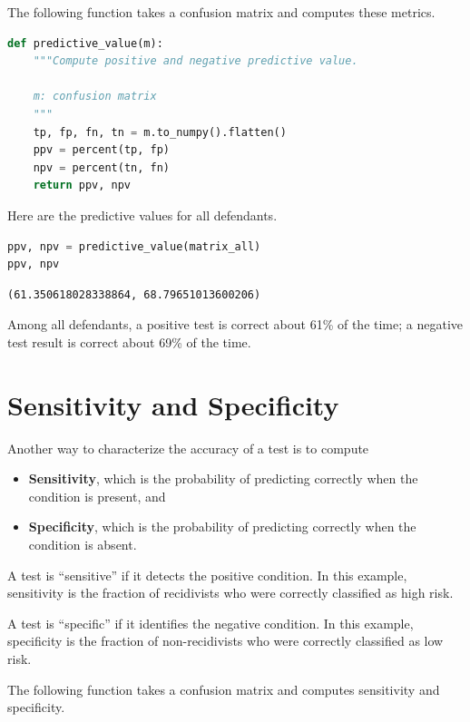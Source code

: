 The following function takes a confusion matrix and computes these
metrics.

\begin{lstlisting}[language=Python]
def predictive_value(m):
    """Compute positive and negative predictive value.
    
    m: confusion matrix
    """
    tp, fp, fn, tn = m.to_numpy().flatten()
    ppv = percent(tp, fp)
    npv = percent(tn, fn)
    return ppv, npv
\end{lstlisting}

Here are the predictive values for all defendants.

\begin{lstlisting}[language=Python]
ppv, npv = predictive_value(matrix_all)
ppv, npv
\end{lstlisting}

\begin{lstlisting}[]
(61.350618028338864, 68.79651013600206)
\end{lstlisting}

Among all defendants, a positive test is correct about 61\% of the time;
a negative test result is correct about 69\% of the time.

\hypertarget{sensitivity-and-specificity}{%
\section{Sensitivity and
Specificity}\label{sensitivity-and-specificity}}

Another way to characterize the accuracy of a test is to compute

\begin{itemize}
\item
  \textbf{Sensitivity}, which is the probability of predicting correctly
  when the condition is present, and
\item
  \textbf{Specificity}, which is the probability of predicting correctly
  when the condition is absent.
\end{itemize}

A test is ``sensitive'' if it detects the positive condition. In this
example, sensitivity is the fraction of recidivists who were correctly
classified as high risk.

A test is ``specific'' if it identifies the negative condition. In this
example, specificity is the fraction of non-recidivists who were
correctly classified as low risk.

The following function takes a confusion matrix and computes sensitivity
and specificity.


